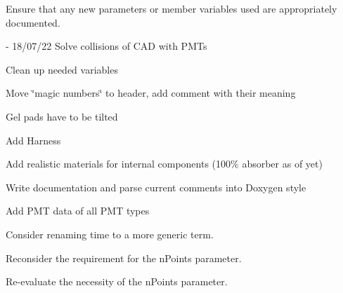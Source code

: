 \begin{DoxyRefList}
Ensure that any new parameters or member variables used are appropriately documented.  
\item[File \mbox{\hyperlink{_o_m_sim_l_o_m18_8cc}{OMSim\+LOM18.cc}} ]\label{todo__todo000006}%
%
-\/ 18/07/22 Solve collisions of CAD with PMTs
\begin{DoxyItemize}
\item Clean up needed variables
\item Move \char`\"{}magic numbers\char`\"{} to header, add comment with their meaning
\item Gel pads have to be tilted
\item Add Harness
\item Add realistic materials for internal components (100\% absorber as of yet)
\item Write documentation and parse current comments into Doxygen style  
\end{DoxyItemize}
\item[Member \mbox{\hyperlink{class_o_m_sim_p_m_t_response_a0dd544847ff216a24aa8c528e76c9aed}{OMSim\+PMTResponse\+::create\+Histogram\+From\+Data}} (const std\+::string \&p\+File\+Path, const char $\ast$p\+TH2\+DName)]\label{todo__todo000002}%
%
Add PMT data of all PMT types  
\item[Member \mbox{\hyperlink{class_o_m_sim_s_n_tools_aa760cb3204e636696ce5be962409694e}{OMSim\+SNTools\+::findtime}} (G4double time, std\+::vector$<$ G4double $>$ timearray)]\label{todo__todo000013}%
%
Consider renaming \textquotesingle{}time\textquotesingle{} to a more generic term.  
\item[Member \mbox{\hyperlink{class_o_m_sim_s_n_tools_acd2197f87f712d54eff8e93b233e8478}{OMSim\+SNTools\+::Inverse\+Cumul}} (std\+::vector$<$ G4double $>$ xvals, std\+::vector$<$ G4double $>$ yvals, G4int n\+Points)]\label{todo__todo000011}%
%
Reconsider the requirement for the \textquotesingle{}n\+Points\textquotesingle{} parameter.  
\item[Member \mbox{\hyperlink{class_o_m_sim_s_n_tools_a296fba8cceca9892ab52ac9e18064b01}{OMSim\+SNTools\+::Inverse\+Cumul\+Algorithm}} (std\+::vector$<$ G4double $>$ x, std\+::vector$<$ G4double $>$ f, std\+::vector$<$ G4double $>$ a, std\+::vector$<$ G4double $>$ Fc, G4int n\+Points)]\label{todo__todo000012}%
%
Re-\/evaluate the necessity of the \textquotesingle{}n\+Points\textquotesingle{} parameter. 
\end{DoxyRefList}